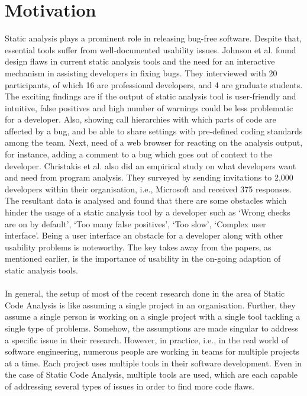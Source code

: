 \chapter{Motivation}
\label{ch:motivation_report}

Static analysis plays a prominent role in releasing bug-free software. Despite that, essential tools suffer from well-documented usability issues. \cite{CB16,JSMB13} Johnson et al. \cite{JSMB13} found design flaws in current static analysis tools and the need for an interactive mechanism in assisting developers in fixing bugs. They interviewed with 20 participants, of which 16 are professional developers, and 4 are graduate students. The exciting findings are if the output of static analysis tool is user-friendly and intuitive, false positives and high number of warnings could be less problematic for a developer. Also, showing call hierarchies with which parts of code are affected by a bug, and be able to share settings with pre-defined coding standards among the team. Next, need of a web browser for reacting on the analysis output, for instance, adding a comment to a bug which goes out of context to the developer. Christakis et al. \cite{CB16} also did an empirical study on what developers want and need from program analysis. They surveyed by sending invitations to 2,000 developers within their organisation, i.e., Microsoft and received 375 responses. The resultant data is analysed and found that there are some obstacles which hinder the usage of a static analysis tool by a developer such as ‘Wrong checks are on by default’, ‘Too many false positives’, ‘Too slow’, ‘Complex user interface’. Being a user interface an obstacle for a developer along with other usability problems is noteworthy. The key takes away from the papers, as mentioned earlier, is the importance of usability in the on-going adaption of static analysis tools. \\ \\ 

In general, the setup of most of the recent research \cite{CB16} \cite{JSMB13} done in the area of Static Code Analysis is like assuming a single project in an organisation. Further, they assume a single person is working on a single project with a single tool tackling a single type of problems. Somehow, the assumptions are made singular to address a specific issue in their research. However, in practice, i.e., in the real world of software engineering, numerous people are working in teams for multiple projects at a time. Each project uses multiple tools in their software development. Even in the case of Static Code Analysis, multiple tools are used, which are each capable of addressing several types of issues in order to find more code flaws. \cite{SCALe} \\ \\

